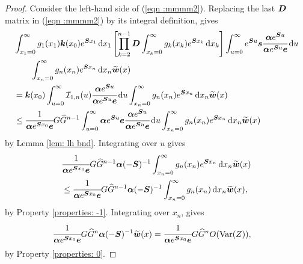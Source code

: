 \begin{proof}

	Consider the left-hand side of (\ref{eqn :mmmm2}). Replacing the last \(\boldsymbol D\) matrix in (\ref{eqn :mmmm2}) by its integral definition, gives 
	\begin{align*}
		&\int_{x_1=0}^\infty g_1(x_1) \boldsymbol k(x_0) e^{\boldsymbol{S}x_1}\, \mathrm{d} x_1
            \left[\prod_{k=2}^{n-1}\boldsymbol D \int_{x_k=0}^\infty g_k(x_k) e^{\boldsymbol{S}x_k} \, \mathrm{d} x_k \right] \int_{u=0}^\infty e^{\boldsymbol S u}\boldsymbol s \cfrac{\boldsymbol \alpha e^{\boldsymbol S u}}{\boldsymbol \alpha e^{\boldsymbol S u} \boldsymbol e}\, \mathrm{d} u 
			\\&\qquad{}\int_{x_n=0}^\infty g_{n}(x_n) e^{\boldsymbol{S}x_n} \, \mathrm{d} x_n \widetilde{\boldsymbol w}(x) 
		\\&=\boldsymbol k(x_0) \int_{u=0}^\infty \mathcal I_{1,n}(u) \cfrac{\boldsymbol \alpha e^{\boldsymbol S u}}{\boldsymbol \alpha e^{\boldsymbol S u} \boldsymbol e}\, \mathrm{d} u \int_{x_n=0}^\infty g_{n}(x_n) e^{\boldsymbol{S}x_n} \, \mathrm{d} x_n \widetilde{\boldsymbol w}(x) 
		\\&\leq \cfrac{1}{\boldsymbol \alpha e^{\boldsymbol{S}x_0}\boldsymbol e}G\widehat G^{n-1} \int_{u=0}^\infty \boldsymbol \alpha e^{\boldsymbol{S}u}\boldsymbol e \cfrac{\boldsymbol \alpha e^{\boldsymbol S u}}{\boldsymbol \alpha e^{\boldsymbol S u} \boldsymbol e}\, \mathrm{d} u \int_{x_n=0}^\infty g_{n}(x_n) e^{\boldsymbol{S}x_n} \, \mathrm{d} x_n \widetilde{\boldsymbol w}(x) 
	\end{align*}
	by Lemma \ref{lem: lh bnd}. Integrating over \(u\) gives 
	\begin{align*}
		&\cfrac{1}{\boldsymbol \alpha e^{\boldsymbol{S}x_0}\boldsymbol e}G\widehat G^{n-1} \boldsymbol \alpha (-\boldsymbol S)^{-1} \int_{x_n=0}^\infty g_{n}(x_n) e^{\boldsymbol{S}x_n} \, \mathrm{d} x_n \widetilde{\boldsymbol w}(x) 
		\\&\leq \cfrac{1}{\boldsymbol \alpha e^{\boldsymbol{S}x_0}\boldsymbol e}G\widehat G^{n-1} \boldsymbol \alpha (-\boldsymbol S)^{-1} \int_{x_n=0}^\infty g_{n}(x_n) \, \mathrm{d} x_n \widetilde{\boldsymbol w}(x),
	\end{align*}
	by Property \ref{properties: -1}. Integrating over \(x_n\), gives
	\begin{align*}
		\cfrac{1}{\boldsymbol \alpha e^{\boldsymbol{S}x_0}\boldsymbol e}G\widehat G^{n} \boldsymbol \alpha (-\boldsymbol S)^{-1} \widetilde{\boldsymbol w}(x) 
		&=\cfrac{1}{\boldsymbol \alpha e^{\boldsymbol{S}x_0}\boldsymbol e}G\widehat G^{n}O(\mathrm{Var}(Z)),
	\end{align*}
	by Property \ref{properties: 0}.
\end{proof}

